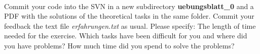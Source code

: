 \\
Commit your code into the SVN in a new subdirectory 
\textbf{uebungsblatt\_0\ExerciseSheetNumber} and a PDF with the solutions of the 
theoretical tasks in the same folder. Commit your feedback the text file 
\emph{erfahrungen.txt} as usual. Please specify: The length of time needed for 
the exercise. Which tasks have been difficult for you and where did you have 
problems? How much time did you spend to solve the problems?
